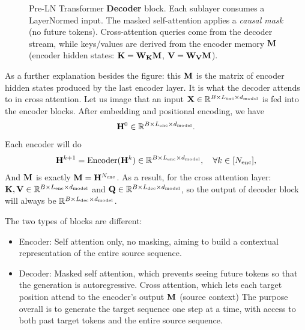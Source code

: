 \documentclass[11pt]{article}  %
\begin{document}
\begin{figure}[h]

\caption{Pre-LN Transformer \textbf{Decoder} block. Each sublayer consumes a LayerNormed input. The masked self-attention applies a \emph{causal mask} (no future tokens). Cross-attention queries come from the decoder stream, while keys/values are derived from the encoder memory $\mathbf{M}$ (encoder hidden states: $\mathbf{K}=\mathbf{W}_{\mathbf{K}}\mathbf{M}$, $\mathbf{V}=\mathbf{W}_{\mathbf{V}}\mathbf{M}$).}
\end{figure}

As a further explanation besides the figure: this $\mathbf{M}$ is the matrix of encoder hidden states produced by the last encoder layer. It is what the decoder attends to in cross attention.
Let us image that an input $\mathbf{X} \in \mathbb{R}^{B \times L_{\text{enc}} \times d_{\text{model}}}$ is fed into the encoder blocks. 
After embedding and positional encoding, we have 
\begin{align*}
  \mathbf{H}^0 \in \mathbb{R}^{B \times L_{\text{enc}} \times d_{\text{model}}}.
\end{align*}
Each encoder will do 
\begin{align*}
  \mathbf{H}^{k+1} = \text{Encoder}(\mathbf{H}^k) \in \mathbb{R}^{B \times L_{\text{enc}} \times d_{\text{model}}}, \quad \forall k \in [N_{\text{enc}}],
\end{align*}
And $\mathbf{M}$ is exactly $\mathbf{M} = \mathbf{H}^{N_{\text{enc}}}$.
As a result, for the cross attention layer: $\mathbf{K}, \mathbf{V} \in \mathbb{R}^{B \times L_{\text{enc}} \times d_{\text{model}}}$ and $\mathbf{Q} \in \mathbb{R}^{B \times L_{\text{dec}} \times d_{\text{model}}}$, so the output of decoder block will always be $\mathbb{R}^{B \times L_{\text{dec}} \times d_{\text{model}}}$.

The two types of blocks are different:
\begin{itemize}
  \item Encoder: Self attention only, no masking, aiming to build a contextual representation of the entire source sequence.
  
  \item Decoder: Masked self attention, which prevents seeing future tokens so that the generation is autoregressive. 
  Cross attention, which lets each target position attend to the encoder's output $\mathbf{M}$ (source context)
  The purpose overall is to generate the target sequence one step at a time, with access to both past target tokens and the entire source sequence.
\end{itemize}
\end{document}
